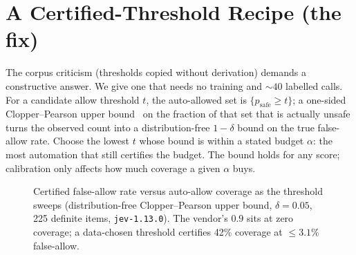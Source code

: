 \documentclass[conference]{IEEEtran}
\newcommand{\code}[1]{\texttt{\small #1}}
\begin{document}
\section{A Certified-Threshold Recipe (the fix)}
\label{sec:fix}
The corpus criticism (thresholds copied without derivation) demands a constructive answer.
We give one that needs no training and ${\sim}40$ labelled calls. For a candidate allow
threshold $t$, the auto-allowed set is $\{p_{\text{safe}}\geq t\}$; a one-sided
Clopper--Pearson upper bound~\cite{clopper1934} on the fraction of that set that is actually
unsafe turns the observed count into a distribution-free $1{-}\delta$ bound on the true
false-allow rate. Choose the lowest $t$ whose bound is within a stated budget $\alpha$: the
most automation that still certifies the budget. The bound holds for any score; calibration
only affects how much coverage a given $\alpha$ buys.

\begin{figure}[t]
\centering
{}
\caption{Certified false-allow rate versus auto-allow coverage as the threshold sweeps
(distribution-free Clopper--Pearson upper bound, $\delta{=}0.05$, 225 definite items,
\code{jev-1.13.0}). The
vendor's $0.9$ sits at zero coverage; a data-chosen threshold certifies 42\% coverage at
$\leq 3.1\%$ false-allow.}
\label{fig:curve}
\end{figure}
\end{document}
